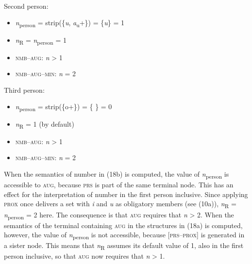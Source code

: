 \documentclass[output=paper]{langsci/langscibook}
\begin{document}
  \ex Second person: \\

\begin{itemize}
\item \textit{n}\textsubscript{person} = {\textbar}strip(\{\textit{u}, \textit{a}\textsubscript{u}+\}){\textbar}  =  {\textbar}\{\textit{u}\}{\textbar}  =  1
\item \textit{n}\textsubscript{R}  =  \textit{n}\textsubscript{person}  =  1
\item \textsc{nmb}–\textsc{aug}: \textit{n} > 1
\item \textsc{nmb}–\textsc{aug}–\textsc{min}: \textit{n} = 2
\end{itemize}

  \ex Third person:\\

\begin{itemize}
\item \textit{n}\textsubscript{person} = {\textbar}strip(\{o+\}){\textbar}  =  {\textbar}\{ \}{\textbar}  =  0
\item \textit{n}\textsubscript{R}  =  1 (by default)
\item \textsc{nmb}–\textsc{aug}: \textit{n} > 1
\item \textsc{nmb}–\textsc{aug}–\textsc{min}: \textit{n} = 2
\end{itemize}
\z
\z

When the semantics of number in (18b) is computed, the value of \textit{n}\textsubscript{person} is accessible to \textsc{aug}, because \textsc{prs} is part of the same terminal node. This has an effect for the interpretation of number in the first person inclusive. Since applying \textsc{prox} once delivers a set with \textit{i} and \textit{u} as obligatory members (see (10a)), \textit{n}\textsubscript{R} = \textit{n}\textsubscript{person} = 2 here. The consequence is that \textsc{aug} requires that \textit{n} > 2. When the semantics of the terminal containing \textsc{aug} in the structures in (18a) is computed, however, the value of \textit{n}\textsubscript{person} is not accessible, because [\textsc{prs}–\textsc{prox}] is generated in a sister node. This means that \textit{n}\textsubscript{R} assumes its default value of 1, also in the first person inclusive, so that \textsc{aug} now requires that \textit{n} > 1.
\end{document}
